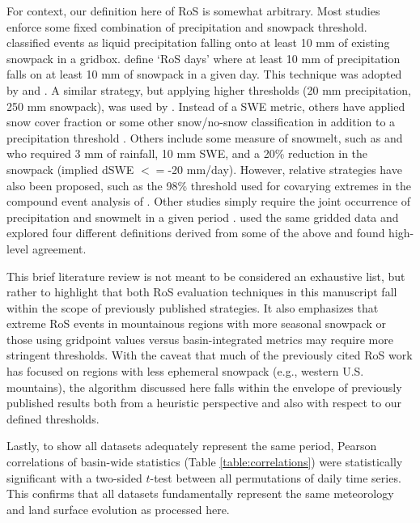 \documentclass[nhess, manuscript]{copernicus}
\begin{document}
For context, our definition here of RoS is somewhat arbitrary. Most studies enforce some fixed combination of precipitation and snowpack threshold. \citet{ye2008winter} classified events as liquid precipitation falling onto at least 10 mm of existing snowpack in a gridbox. \citet{musselman2018projected} define `RoS days' where at least 10 mm of precipitation falls on at least 10 mm of snowpack in a given day. This technique was adopted by \citet{lopez2021changes} and \citet{maina2023diverging}. A similar strategy, but applying higher thresholds (20 mm precipitation, 250 mm snowpack), was used by \citet{wurzer2016influence}. Instead of a SWE metric, others have applied snow cover fraction or some other snow/no-snow classification in addition to a precipitation threshold \citep{mazurkiewicz2008assessing,pradhanang2013rain,cohen2015trends}. Others include some measure of snowmelt, such as \citet{freudiger2014large} and \citet{li2019the} who required 3 mm of rainfall, 10 mm SWE, and a 20\% reduction in the snowpack (implied dSWE $<=$-20 mm/day). However, relative strategies have also been proposed, such as the 98\% threshold used for covarying extremes in the compound event analysis of \citet{poschlod2020climate}. Other studies simply require the joint occurrence of precipitation and snowmelt in a given period \citep{mccabe2007rain,surfleet2013variability,collins2014annual,guan2016hydrometeorological,jeong2018rain}. \citet{wachowicz2020rain} used the same gridded data and explored four different definitions derived from some of the above and found high-level agreement.

This brief literature review is not meant to be considered an exhaustive list, but rather to highlight that both RoS evaluation techniques in this manuscript fall within the scope of previously published strategies. It also emphasizes that extreme RoS events in mountainous regions with more seasonal snowpack or those using gridpoint values versus basin-integrated metrics may require more stringent thresholds. With the caveat that much of the previously cited RoS work has focused on regions with less ephemeral snowpack (e.g., western U.S. mountains), the algorithm discussed here falls within the envelope of previously published results both from a heuristic perspective and also with respect to our defined thresholds.

Lastly, to show all datasets adequately represent the same period, Pearson correlations of basin-wide statistics (Table \ref{table:correlations}) were statistically significant with a two-sided $t$-test between all permutations of daily time series. This confirms that all datasets fundamentally represent the same meteorology and land surface evolution as processed here.
\end{document}
